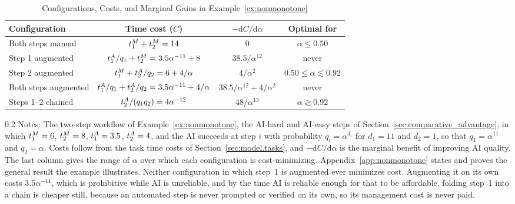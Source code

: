 \begin{table}[p]
\vspace{0.6cm}

\centering
\caption{Configurations, Costs, and Marginal Gains in Example~\ref{ex:nonmonotone}}
\label{tab:nonmonotone_costs}
\singlespacing
\footnotesize
\setlength{\tabcolsep}{10pt}
\begin{tabular}{lccc}
\toprule
Configuration & Time cost ($C$) & $-\mathrm{d}C/\mathrm{d}\alpha$ & Optimal for \\
\midrule
Both steps manual & $t^{M}_{1} + t^{M}_{2} = 14$ & $0$ & $\alpha \leq 0.50$ \\
\midrule
Step 1 augmented & $t^{A}_{1}/q_1 + t^{M}_{2} = 3.5\alpha^{-11} + 8$ & $38.5/\alpha^{12}$ & never \\
\midrule
Step 2 augmented & $t^{M}_{1} + t^{A}_{2}/q_2 = 6 + 4/\alpha$ & $4/\alpha^{2}$ & $0.50 \leq \alpha \lesssim 0.92$ \\
\midrule
Both steps augmented & $t^{A}_{1}/q_1 + t^{A}_{2}/q_2 = 3.5\alpha^{-11} + 4/\alpha$ & $38.5/\alpha^{12} + 4/\alpha^{2}$ & never \\
\midrule
Steps 1--2 chained & $t^{A}_{2}/(q_1 q_2) = 4\alpha^{-12}$ & $48/\alpha^{13}$ & $\alpha \gtrsim 0.92$ \\
\bottomrule
\end{tabular}
\par\vspace{\fignotesskip}
\begin{minipage}{1\linewidth}
\begin{spacing}{0.2}
{\fontsize{9.5pt}{10pt}\selectfont Notes: The two-step workflow of Example~\ref{ex:nonmonotone}, the AI-hard and AI-easy steps of Section~\ref{sec:comparative_advantage}, in which $t^{M}_{1}=6$, $t^{M}_{2}=8$, $t^{A}_{1}=3.5$, $t^{A}_{2}=4$, and the AI succeeds at step $i$ with probability $q_i = \alpha^{d_i}$ for $d_1 = 11$ and $d_2 = 1$, so that $q_1 = \alpha^{11}$ and $q_2 = \alpha$.
Costs follow from the task time costs of Section~\ref{sec:model.tasks}, and $-\mathrm{d}C/\mathrm{d}\alpha$ is the marginal benefit of improving AI quality.
The last column gives the range of $\alpha$ over which each configuration is cost-minimizing.
Appendix~\ref{app:nonmonotone} states and proves the general result the example illustrates.
Neither configuration in which step~1 is augmented ever minimizes cost.
Augmenting it on its own costs $3.5\alpha^{-11}$, which is prohibitive while AI is unreliable, and by the time AI is reliable enough for that to be affordable, folding step~1 into a chain is cheaper still, because an automated step is never prompted or verified on its own, so its management cost is never paid.}
\end{spacing}
\end{minipage}
\end{table}


